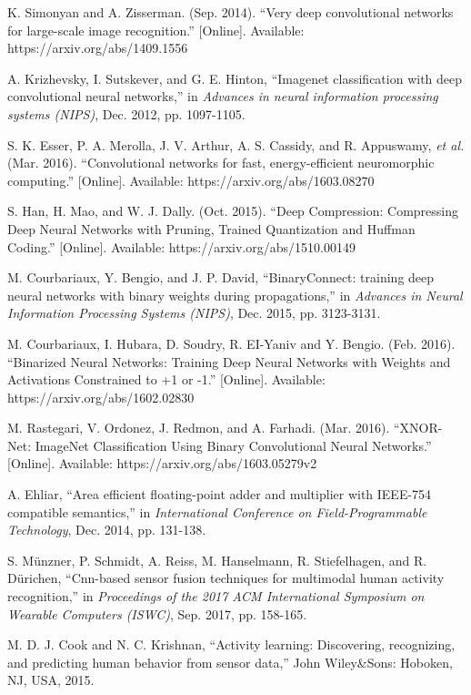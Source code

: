 \documentclass[twoside,twocolumn]{article}
\begin{document}
\begin{thebibliography}{00}
 K. Simonyan and A. Zisserman. (Sep. 2014). ``Very deep convolutional networks for large-scale image recognition.'' [Online]. Available: https://arxiv.org/abs/1409.1556

 A. Krizhevsky, I. Sutskever, and G. E. Hinton, ``Imagenet classification with deep convolutional neural networks,'' in \emph{Advances in neural information processing systems (NIPS)}, Dec. 2012, pp. 1097-1105.

 S. K. Esser, P. A. Merolla, J. V. Arthur, A. S. Cassidy, and R. Appuswamy, \emph{et al.} (Mar. 2016). ``Convolutional networks for fast, energy-efficient neuromorphic computing.'' [Online]. Available: https://arxiv.org/abs/1603.08270

 S. Han, H. Mao, and W. J. Dally. (Oct. 2015). ``Deep Compression: Compressing Deep Neural Networks with Pruning, Trained Quantization and Huffman Coding.'' [Online]. Available: https://arxiv.org/abs/1510.00149

 M. Courbariaux, Y. Bengio, and J. P. David, ``BinaryConnect: training deep neural networks with binary weights during propagations,'' in \emph{Advances in Neural Information Processing Systems (NIPS)}, Dec. 2015, pp. 3123-3131.

 M. Courbariaux, I. Hubara, D. Soudry, R. EI-Yaniv and Y. Bengio. (Feb. 2016). ``Binarized Neural Networks: Training Deep Neural Networks with Weights and Activations Constrained to +1 or -1.'' [Online]. Available: https://arxiv.org/abs/1602.02830

 M. Rastegari, V. Ordonez, J. Redmon, and A. Farhadi. (Mar. 2016). ``XNOR-Net: ImageNet Classification Using Binary Convolutional Neural Networks.'' [Online]. Available: https://arxiv.org/abs/1603.05279v2

 A. Ehliar, ``Area efficient floating-point adder and multiplier with IEEE-754 compatible semantics,'' in \emph{International Conference on Field-Programmable Technology}, Dec. 2014, pp. 131-138.

 S. M{\"{u}}nzner, P. Schmidt, A. Reiss, M. Hanselmann, R. Stiefelhagen, and R. D{\"{u}}richen, ``Cnn-based sensor fusion techniques for multimodal human activity recognition,'' in \emph{Proceedings of the 2017 ACM International Symposium on Wearable Computers (ISWC)}, Sep. 2017, pp. 158-165.

 M. D. J. Cook and N. C. Krishnan, ``Activity learning: Discovering, recognizing, and predicting human behavior from sensor data,'' John Wiley\&Sons: Hoboken, NJ, USA, 2015.


\end{thebibliography}
\end{document}
